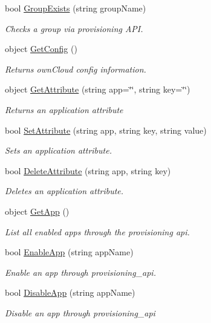 \begin{DoxyCompactItemize}
bool \hyperlink{classowncloudsharp_1_1_client_a0eb9c35f345906e16175605b0cc08ade}{Group\+Exists} (string group\+Name)
\begin{DoxyCompactList}\small\item\em Checks a group via provisioning A\+P\+I. \end{DoxyCompactList}\item 
object \hyperlink{classowncloudsharp_1_1_client_a8815e55195807037bd6c8d239ff7369a}{Get\+Config} ()
\begin{DoxyCompactList}\small\item\em Returns own\+Cloud config information. \end{DoxyCompactList}\item 
object \hyperlink{classowncloudsharp_1_1_client_afb8ad7cb10feb92462a4792661654537}{Get\+Attribute} (string app=\char`\"{}\char`\"{}, string key=\char`\"{}\char`\"{})
\begin{DoxyCompactList}\small\item\em Returns an application attribute \end{DoxyCompactList}\item 
bool \hyperlink{classowncloudsharp_1_1_client_a0939782439f44c5250d66147755d4c25}{Set\+Attribute} (string app, string key, string value)
\begin{DoxyCompactList}\small\item\em Sets an application attribute. \end{DoxyCompactList}\item 
bool \hyperlink{classowncloudsharp_1_1_client_ad94e83b297c9de310beafd878fd99bc4}{Delete\+Attribute} (string app, string key)
\begin{DoxyCompactList}\small\item\em Deletes an application attribute. \end{DoxyCompactList}\item 
object \hyperlink{classowncloudsharp_1_1_client_ad781c23e20eee028f3b05ffd722b8c27}{Get\+App} ()
\begin{DoxyCompactList}\small\item\em List all enabled apps through the provisioning api. \end{DoxyCompactList}\item 
bool \hyperlink{classowncloudsharp_1_1_client_a4023a60f6fa18288d4b9cf8cba705e7c}{Enable\+App} (string app\+Name)
\begin{DoxyCompactList}\small\item\em Enable an app through provisioning\+\_\+api. \end{DoxyCompactList}\item 
bool \hyperlink{classowncloudsharp_1_1_client_a77306ba08609c9cf128e62b955227648}{Disable\+App} (string app\+Name)
\begin{DoxyCompactList}\small\item\em Disable an app through provisioning\+\_\+api \end{DoxyCompactList}\end{DoxyCompactItemize}


